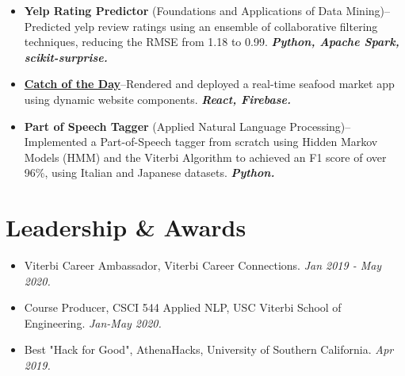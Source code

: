 \documentclass[letterpaper,10pt]{article}
\newcommand{\pro}[4]{
    \item \textbf{#1} {#2}--{#3} \textbf{\textit{#4}}
}
\newcommand{\prowlink}[4]{
    \item \href{#2}{\textbf{#1}}--{#3} \textbf{\textit{#4}}
}
\newcommand{\activity}[2]{
    \item #1 \emph{#2}
}
\newcommand{\bulletsBegin}{
    \vspace{1pt}
    \begin{minipage}{17.6cm}
    \begin{itemize}[leftmargin=0.6cm]
    \setlength\itemsep{-0.1em}
}
\newcommand{\bulletsEnd}{
    \end{itemize}\vspace{0pt}
    \end{minipage}
}
\begin{document}
        \bulletsBegin
            \vspace{-3pt}
        \pro{Yelp Rating Predictor}{(Foundations and Applications of Data Mining)}
            {Predicted yelp review ratings using an ensemble of collaborative filtering techniques, reducing the RMSE from 1.18 to 0.99.}
            {Python, Apache Spark, scikit-surprise.}
        \prowlink
		 {Catch of the Day}{https://divyanshi26.github.io/divy-catch-of-the-day/}
            {Rendered and deployed a real-time seafood market app using dynamic website components.}
            {React, Firebase.}
        \pro{Part of Speech Tagger}{(Applied Natural Language Processing)}
            {Implemented a Part-of-Speech tagger from scratch using Hidden Markov Models (HMM) and the Viterbi Algorithm to achieved an F1 score of over 96\%, using Italian and Japanese datasets.}
            {Python.}
        
        \bulletsEnd

    
    \section{Leadership \& Awards}

    \bulletsBegin
        \activity{Viterbi Career Ambassador, Viterbi Career Connections.}
        {Jan 2019 - May 2020.}
        \vspace{-3pt}
        \activity{Course Producer, CSCI 544 Applied NLP, USC Viterbi School of Engineering.}
        {Jan-May 2020.}
        \vspace{-3pt}
        \activity{Best "Hack for Good", AthenaHacks, University of Southern California.}
        {Apr 2019.}
        \vspace{-2pt}
    \bulletsEnd

\end{document}
